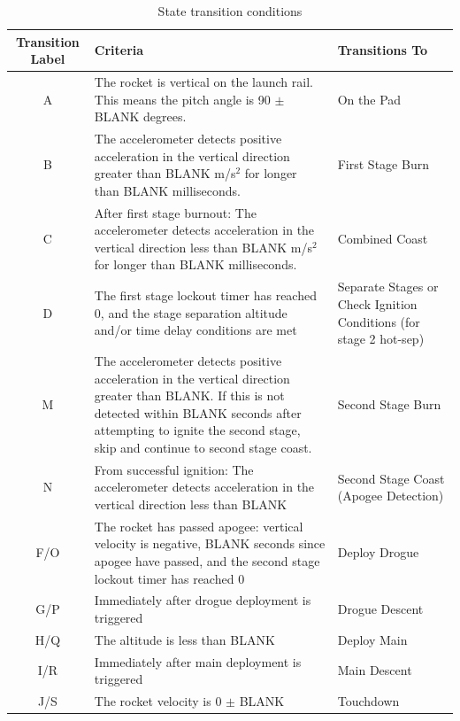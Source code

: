 \begin{table}[htbp]
    \centering
    \setlength{\tymin}{40pt}
    \let\raggedright\RaggedRight
    
    \begin{tabulary}{\textwidth}{@{}CLL@{}}  %
    \toprule
        \textbf{Transition Label} & \textbf{Criteria} & \textbf{Transitions To} \\
    \midrule
        A & The rocket is vertical on the launch rail. This means the pitch angle is 90 \(\pm\) BLANK degrees. & On the Pad \\
        B & The accelerometer detects positive acceleration in the vertical direction greater than BLANK m/s\(^2\) for longer than BLANK milliseconds. & First Stage Burn \\
        C & After first stage burnout: The accelerometer detects acceleration in the vertical direction less than BLANK m/s\(^2\) for longer than BLANK milliseconds. & Combined Coast \\
        D & The first stage lockout timer has reached 0, and the stage separation altitude and/or time delay conditions are met & Separate Stages or Check Ignition Conditions (for stage 2 hot-sep) \\
        M & The accelerometer detects positive acceleration in the vertical direction greater than BLANK. If this is not detected within BLANK seconds after attempting to ignite the second stage, skip and continue to second stage coast. & Second Stage Burn \\
        N & From successful ignition: The accelerometer detects acceleration in the vertical direction less than BLANK & Second Stage Coast (Apogee Detection) \\
        F/O & The rocket has passed apogee: vertical velocity is negative, BLANK seconds since apogee have passed, and the second stage lockout timer has reached 0 & Deploy Drogue \\
        G/P & Immediately after drogue deployment is triggered & Drogue Descent \\
        H/Q & The altitude is less than BLANK & Deploy Main \\
        I/R & Immediately after main deployment is triggered & Main Descent \\
        J/S & The rocket velocity is 0 \(\pm\) BLANK & Touchdown \\
    \bottomrule
    \end{tabulary}

    \caption{State transition conditions}
    \label{table:av-state-transitions}
\end{table}


